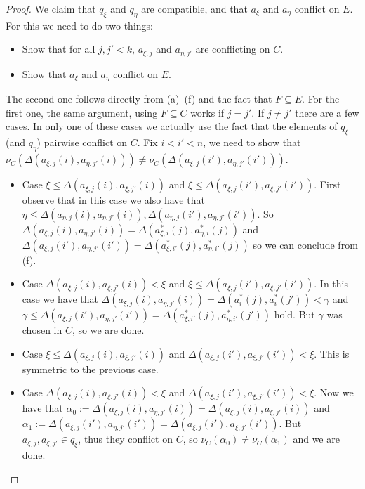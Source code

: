 \documentclass[a4paper,noamsfonts]{amsart}
\theoremstyle{definition}
\newcommand{\seb}{\subseteq}
\newcommand{\1}{\mathbbm{1}}
\begin{document}
\begin{proof}
  We claim that $q_{\xi}$ and $q_{\eta}$ are compatible, and
  that $a_{\xi}$ and $a_{\eta}$ conflict on $E$. For this we need to do
  two things:
  \begin{itemize}
    \item Show that for all $j,j' < k$, $a_{\xi,j}$ and $a_{\eta,j'}$ are
    conflicting on $C$. 
    \item Show that $a_{\xi}$ and $a_{\eta}$ conflict on $E$.
  \end{itemize}
  The second one follows directly from (a)--(f) and the fact
  that $F  \seb E$. For the first one, the same argument, using $F \seb
  C$ works if $j = j'$. If $j \neq j'$ there are a few cases. In only
  one of these cases we actually use the fact that the elements of
  $q_{\xi}$ (and $q_{\eta}$) pairwise conflict on $C$. Fix $i < i' < n$,
  we need to show that $\nu_{C}(\Delta(a_{\xi,j}(i),a_{\eta,j'}(i)))
  \neq \nu_{C}(\Delta(a_{\xi,j}(i'),a_{\eta,j'}(i')))$.

  \begin{itemize}
    \item[$\blacktriangleright$] Case
    $\xi \le \Delta(a_{\xi,j}(i),a_{\xi,j'}(i))$ and
    $\xi \le \Delta(a_{\xi,j}(i'),a_{\xi,j'}(i'))$. First observe that
    in this case we also have
    that $\eta \le \Delta(a_{\eta,j}(i),a_{\eta,j'}(i)),
    \Delta(a_{\eta,j}(i'),a_{\eta,j'}(i'))$.
    So
    $\Delta(a_{\xi,j}(i),a_{\eta,j'}(i)) = \Delta(a^{*}_{\xi,i}(j),a^{*}_{\eta,i}(j))$
    and
    $\Delta(a_{\xi,j}(i'),a_{\eta,j'}(i')) = \Delta(a^{*}_{\xi,i'}(j),a^{*}_{\eta,i'}(j))$
    so we can conclude from (f).
    \item[$\blacktriangleright$] Case
    $\Delta(a_{\xi,j}(i),a_{\xi,j'}(i)) < \xi$ and
    $\xi \le \Delta(a_{\xi,j}(i'),a_{\xi,j'}(i'))$.
    In this case
    we have that $\Delta(a_{\xi,j}(i),a_{\eta,j'}(i)) =
    \Delta(a^{*}_{i}(j),a^{*}_{i}(j')) < \gamma$
    and $\gamma \le \Delta(a_{\xi,j}(i'),a_{\eta,j'}(i')) =
    \Delta(a^{*}_{\xi,i'}(j),a^{*}_{\eta,i'}(j'))$
    hold. But $\gamma$ was chosen in $C$, so we are done.
    \item[$\blacktriangleright$] Case
    $\xi \le \Delta(a_{\xi,j}(i),a_{\xi,j'}(i))$ and
    $\Delta(a_{\xi,j}(i'),a_{\xi,j'}(i')) < \xi$.
    This is symmetric to the previous
    case.
    \item[$\blacktriangleright$]
    Case $\Delta(a_{\xi,j}(i),a_{\xi,j'}(i)) < \xi$ and
    $\Delta(a_{\xi,j}(i'),a_{\xi,j'}(i')) < \xi$. Now
    we have that
    $\alpha_{0} := \Delta(a_{\xi,j}(i),a_{\eta,j'}(i))
    = \Delta(a_{\xi,j}(i),a_{\xi,j'}(i))$
    and $\alpha_{1} := \Delta(a_{\xi,j}(i'),a_{\eta,j'}(i'))
    = \Delta(a_{\xi,j}(i'),a_{\xi,j'}(i'))$.
    But $a_{\xi,j}, a_{\xi,j'} \in q_{\xi}$,
    thus they conflict on $C$, so $\nu_{C}(\alpha_{0})
    \neq \nu_{C}(\alpha_{1})$ and we are done.
  \end{itemize}


\end{proof}
\end{document}
